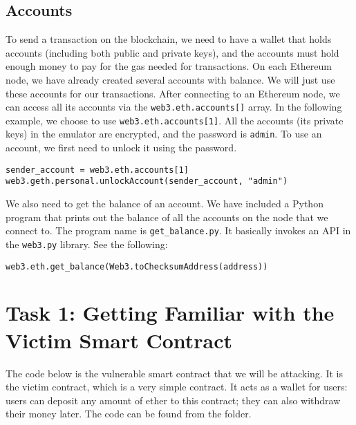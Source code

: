  

\subsection{Accounts} 

To send a transaction on the blockchain, we need to 
have a wallet that holds accounts (including both public and 
private keys), and the accounts must hold enough money to pay for the gas 
needed for transactions. On each Ethereum node, we have already
created several accounts with balance. We will just use 
these accounts for our transactions. After connecting to
an Ethereum node, we can access all its accounts via
the \texttt{web3.eth.accounts[]} array. In the following 
example, we choose to use \texttt{web3.eth.accounts[1]}. 
All the accounts (its private keys) in the emulator are 
encrypted, and the password is \texttt{admin}. To use 
an account, we first need to unlock it using the password. 

\begin{lstlisting}
sender_account = web3.eth.accounts[1]
web3.geth.personal.unlockAccount(sender_account, "admin")
\end{lstlisting}



We also need to get the balance of an account. We 
have included a Python program that prints out the balance
of all the accounts on the node that we connect to. The 
program name is \texttt{get\_balance.py}. It basically
invokes an API in the \texttt{web3.py} library.  
See the following:

\begin{lstlisting}
web3.eth.get_balance(Web3.toChecksumAddress(address))
\end{lstlisting}
 




\section{Task 1: Getting Familiar with the Victim Smart Contract} 

The code below is the vulnerable smart contract that we will be attacking. 
It is the victim contract, which is a very simple contract. 
It acts as a wallet for users: users can deposit any amount of ether to 
this contract; they can also withdraw their money later.
The code can be found from the  folder. 

